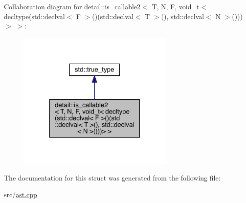 Collaboration diagram for detail\+:\+:is\+\_\+callable2$<$ T, N, F, void\+\_\+t$<$ decltype(std\+:\+:declval$<$ F $>$()(std\+:\+:declval$<$ T $>$(), std\+:\+:declval$<$ N $>$()))$>$ $>$\+:\nopagebreak
\begin{figure}[H]
\begin{center}
\leavevmode
\includegraphics[width=218pt]{structdetail_1_1is__callable2_3_01_t_00_01_n_00_01_f_00_01void__t_3_01decltype_07std_1_1declval_40d94e49e92f72cdf10f4b851b3c4af9}
\end{center}
\end{figure}


The documentation for this struct was generated from the following file\+:\begin{DoxyCompactItemize}
\item 
src/\hyperlink{ast_8cpp}{ast.\+cpp}\end{DoxyCompactItemize}
